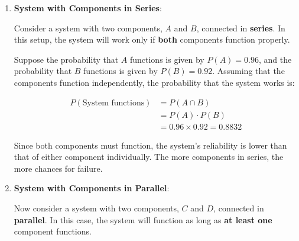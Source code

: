 \documentclass[twoside]{book}
\begin{document}
\begin{enumerate}

\item \textbf{System with Components in Series}:

Consider a system with two components, \( A \) and \( B \), connected in \textbf{series}. In this setup, the system will work only if \textbf{both} components function properly.

\begin{center}
\end{center}

Suppose the probability that $A$ functions is given by $P(A) = 0.96$, and the probability that $B$ functions is given by
$P(B) = 0.92$. Assuming that the components function independently, the probability that the system works is:

\[
\begin{aligned}
P(\text{System functions}) &= P(A \cap B) \\
&= P(A) \cdot P(B) \\
&= 0.96\times 0.92 = 0.8832
\end{aligned}
\]

Since both components must function, the system's reliability is lower than that of either component individually. The more components in series, the more chances for failure.

\item \textbf{System with Components in Parallel}:

Now consider a system with two components, \( C \) and \( D \), connected in \textbf{parallel}. In this case, the system will function as long as \textbf{at least one} component functions.

\begin{center}
\end{center}
\end{enumerate}
\end{document}
